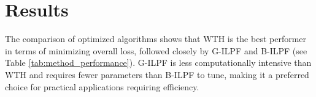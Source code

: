 \documentclass[iucr,review]{iucrjournals}
\begin{document}



\section{Results}
The comparison of optimized algorithms shows that WTH is the best performer in terms of
minimizing overall loss, followed closely by G-ILPF and B-ILPF (see Table \ref{tab:method_performance}).
G-ILPF is less computationally intensive than WTH and requires fewer parameters than B-ILPF to tune,
making it a preferred choice for practical applications requiring efficiency.
\end{document}
